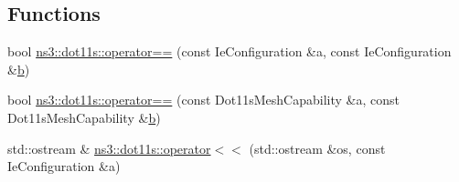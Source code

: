 \subsection*{Functions}
\begin{DoxyCompactItemize}
\item 
bool \hyperlink{namespacens3_1_1dot11s_a288f06a242c228041c8a9c6c263fbe87}{ns3\+::dot11s\+::operator==} (const Ie\+Configuration \&a, const Ie\+Configuration \&\hyperlink{lte__pathloss_8m_a21ad0bd836b90d08f4cf640b4c298e7c}{b})
\item 
bool \hyperlink{namespacens3_1_1dot11s_ad7bacd8b85ae4f1f7db30407e1a839de}{ns3\+::dot11s\+::operator==} (const Dot11s\+Mesh\+Capability \&a, const Dot11s\+Mesh\+Capability \&\hyperlink{lte__pathloss_8m_a21ad0bd836b90d08f4cf640b4c298e7c}{b})
\item 
std\+::ostream \& \hyperlink{namespacens3_1_1dot11s_a427f6494f33ad73c73a90846abec787d}{ns3\+::dot11s\+::operator$<$$<$} (std\+::ostream \&os, const Ie\+Configuration \&a)
\end{DoxyCompactItemize}
